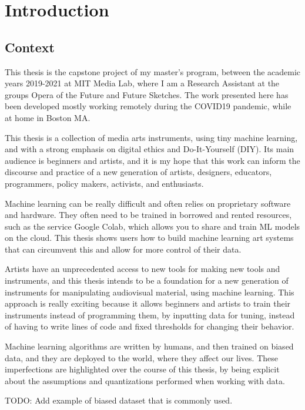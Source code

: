 \chapter{Introduction}

\section{Context}

This thesis is the capstone project of my master's program, between the academic years 2019-2021 at MIT Media Lab, where I am a Research Assistant at the groups Opera of the Future and Future Sketches. The work presented here has been developed mostly working remotely during the COVID19 pandemic, while at home in Boston MA.

This thesis is a collection of media arts instruments, using tiny machine learning, and with a strong emphasis on digital ethics and Do-It-Yourself (DIY). Its main audience is beginners and artists, and it is my hope that this work can inform the discourse and practice of a new generation of artists,  designers, educators, programmers, policy makers, activists, and enthusiasts.

Machine learning can be really difficult and often relies on proprietary software and hardware. They often need to be trained in borrowed and rented resources, such as the service Google Colab, which allows you to share and train ML models on the cloud. This thesis shows users how to build machine learning art systems that can circumvent this and allow for more control of their data.

Artists have an unprecedented access to new tools for making new tools and instruments, and this thesis intends to be a foundation for a new generation of instruments for manipulating audiovisual material, using machine learning. This approach is really exciting because it allows beginners and artists to train their instruments instead of programming them, by inputting data for tuning, instead of having to write lines of code and fixed thresholds for changing their behavior.

Machine learning algorithms are written by humans, and then trained on biased data, and they are deployed to the world, where they affect our lives. These imperfections are highlighted over the course of this thesis, by being explicit about the assumptions and quantizations performed when working with data.

TODO: Add example of biased dataset that is commonly used.

